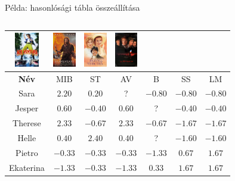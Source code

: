 \documentclass[english, aspectratio=169]{beamer}
\begin{document}
\begin{frame}{Példa: hasonlósági tábla összeállítása}
\begin{columns}
\begin{column}{.8\textwidth}
\begin{center}
\begin{footnotesize}
\begin{tabular}{|c|c|c|c|c|c|c|}
\includegraphics[height=1.5cm, keepaspectratio]{images/movies/ace_ventura.png} &
\includegraphics[height=1.5cm, keepaspectratio]{images/movies/braveheart.png} &
\includegraphics[height=1.5cm, keepaspectratio]{images/movies/sense_and_sensibility.png} &
\includegraphics[height=1.5cm, keepaspectratio]{images/movies/les_miserables.png} \\
\hline
\textbf{Név} & MIB & ST & AV & B & SS & LM\\ 
\hline
Sara & $2.20$ & $0.20$ & ? & $-0.80$ & $-0.80$ & $-0.80$\\ 
\hline
Jesper & $0.60$ & $-0.40$ & $0.60$ & ? & $-0.40$ & $-0.40$\\ 
\hline
Therese & $2.33$ & $-0.67$ & $2.33$ & $-0.67$ & $-1.67$ & $-1.67$\\ 
\hline
Helle & $0.40$ & $2.40$ & $0.40$ & ? & $-1.60$ & $-1.60$\\ 
\hline
Pietro & $-0.33$ & $-0.33$ & $-0.33$ & $-1.33$ & $0.67$ & $1.67$\\ 
\hline
Ekaterina & $-1.33$ & $-0.33$ & $-1.33$ & $0.33$ & $1.67$ & $1.67$\\ 
\hline
\end{tabular}
\end{footnotesize}
\end{center}
\end{column}
\end{columns}
\end{frame}
\end{document}

